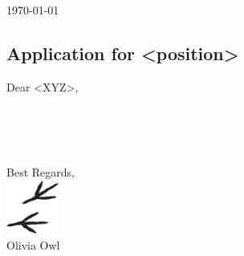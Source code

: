 \begin{center}
\begin{minipage}[t]{0.9\textwidth}
\vspace{1cm}
{\large \today}
\vspace{1cm}
\subsection*{Application for <position>}
\vspace{1cm}
{\normalsize

	Dear <XYZ>,\vspace{2\baselineskip}

	\lorem\lorem\lorem\lorem\lorem\lorem\\

	\lorem\lorem\lorem\lorem\lorem\lorem\\

	\lorem\lorem\lorem\lorem\lorem\lorem\\

	\lorem\lorem\lorem\lorem\lorem\lorem

	\vspace{2\baselineskip}
	Best Regards,\\[0.75\baselineskip]
	\includegraphics[height=1.75cm,keepaspectratio]{resources/sig.png}\\[\baselineskip]
	Olivia Owl
}
\end{minipage}
\end{center}





